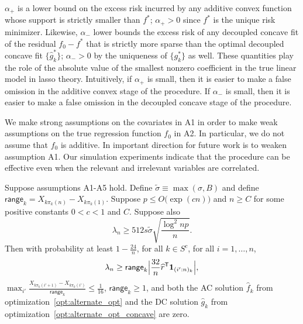 $\alpha_+$ is a lower bound on the excess risk incurred by any additive convex function whose support is strictly smaller than $f^*$; $\alpha_+ > 0$ since $f^*$ is the unique risk minimizer. Likewise, $\alpha_-$ lower bounds the excess risk of any decoupled concave fit of the residual $f_0 - f^*$ that is strictly more sparse than the optimal decoupled concave fit $\{\hat{g}_k^*\}$; $\alpha_- > 0$ by the uniqueness of $\{g^*_k\}$ as well. These quantities play the role of the absolute value of the smallest nonzero coefficient in the true linear model in lasso theory.  Intuitively, if
$\alpha_{+}$ is small, then it is easier to make a false omission in the
additive convex stage of the procedure. If $\alpha_{-}$ is small, then
it is easier to make a false omission in the decoupled concave stage
of the procedure.

\begin{remark}
  We make strong assumptions on the covariates in A1 in order to make
  weak assumptions on the true regression function $f_0$ in
  A2. In particular, we do not assume that $f_0$ is additive. In
  important direction for future work is to weaken assumption A1.
  Our simulation experiments indicate that the procedure can be
  effective even when the relevant and irrelevant variables are correlated.
\end{remark}


\begin{theorem}
\label{thm:false_positive}
Suppose assumptions A1-A5 hold. Define $\tilde{\sigma} \equiv \max(\sigma, B)$ and define $\mathsf{range}_k = X_{k \pi_k(n)} - X_{k \pi_k(1)}$. Suppose $p \leq O\big( \exp(c n) \big)$ and $n \geq C$ for some positive constants $0 < c <1$ and $C$.  Suppose also
\begin{equation}
\lambda_n \geq 512 s \tilde{\sigma}  \sqrt{ \frac{\log^2 np}{n}}.
\end{equation}  
Then with probability at least $ 1 - \frac{24}{n}$, for all $k \in
S^c$, for all $i=1,\ldots,n$,
\begin{equation}
\lambda_n \geq \mathsf{range}_k \Big| \frac{32}{n}\widehat{r}^{\mathsf{T}} \mbox{\boldmath $1$}_{(i':n)_k} \Big| ,
\end{equation}
$\max_{i'} \frac{X_{k\pi_k(i'+1)} - X_{k \pi_k(i')}}{\mathsf{range}_k} \leq \frac{1}{16}$, $\mathsf{range}_k \geq 1$, and both the AC solution $\hat{f}_k$ from optimization~\eqref{opt:alternate_opt} and the DC solution $\hat{g}_k$ from optimization~\eqref{opt:alternate_opt_concave} are zero. 
\end{theorem}

